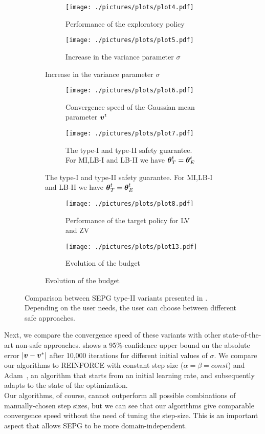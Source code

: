 \begin{figure}[t!]
\centering
\begin{subfigure}[t]{\textwidth}
\begin{subfigure}[t]{0.5\textwidth}
\texttt{[image: ./pictures/plots/plot4.pdf]}
\caption{Performance of the exploratory policy} \label{fig:plot2-1}
\end{subfigure}
\hfill
\begin{subfigure}[t]{0.5\textwidth}
\texttt{[image: ./pictures/plots/plot5.pdf]}
\caption{Increase in the variance parameter $\sigma$} \label{fig:plot2-2}
\end{subfigure}
\end{subfigure}
\begin{subfigure}[t]{\textwidth}
\begin{subfigure}[t]{0.5\textwidth}
\texttt{[image: ./pictures/plots/plot6.pdf]}
\caption{Convergence speed of the Gaussian mean parameter $\boldsymbol{v}^t$} \label{fig:plot2-3}
\end{subfigure}
\hfill
\begin{subfigure}[t]{0.5\textwidth}
\texttt{[image: ./pictures/plots/plot7.pdf]}
\caption{The type-I and type-II safety guarantee. For MI,LB-I and LB-II we have ${\boldsymbol{\theta}}^t_T = {\boldsymbol{\theta}}^t_E$} \label{fig:plot2-4}
\end{subfigure}
\end{subfigure}
\begin{subfigure}[t]{\textwidth}
\begin{subfigure}[t]{0.5\textwidth}
\texttt{[image: ./pictures/plots/plot8.pdf]}
\caption{Performance of the target policy for LV and ZV} \label{fig:plot2-5}
\end{subfigure}
\begin{subfigure}[t]{0.5\textwidth}
\texttt{[image: ./pictures/plots/plot13.pdf]}
\caption{Evolution of the budget} \label{fig:plot2-6}
\end{subfigure}
\end{subfigure}

\caption[Comparison between SEPG type-II variants.]{Comparison between SEPG type-II variants presented in . Depending on the user needs, the user can choose between different safe approaches. }
\label{fig:plot2}
\end{figure}

Next, we compare the convergence speed of these variants with other state-of-the-art non-safe approaches.
 shows a 95\%-confidence upper bound  on the absolute error $|\boldsymbol{v} - \boldsymbol{v}^*|$ after 10,000 iterations for different initial values of $\sigma$. We compare our algorithms to REINFORCE with constant step size ($\alpha = \beta = const$) and Adam~\cite{kingma2014adam}, an algorithm that starts from an initial learning rate, and subsequently adapts to the state of the optimization. \\
Our algorithms, of course, cannot outperform all possible combinations of manually-chosen step sizes, but we can see that our algorithms give comparable convergence speed without the need of tuning the step-size. This is an important aspect that allows SEPG to be more domain-independent.

